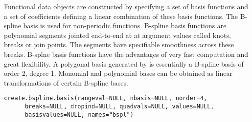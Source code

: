 \documentclass{article}
\begin{document}
\begin{Description}\relax
Functional data objects are constructed by specifying a set of basis
functions and a set of coefficients defining a linear combination of
these basis functions.  The B-spline basis is used for non-periodic
functions.  B-spline basis functions are polynomial segments jointed
end-to-end at at argument values called knots, breaks or join points.
The segments have specifiable smoothness across these breaks.  B-splne
basis functions have the advantages of very fast computation and great
flexibility.  A polygonal basis generated by
 is essentially a B-spline basis of order
2, degree 1.  Monomial and polynomial bases can be obtained as linear
transformations of certain B-spline bases.
\end{Description}
\begin{Usage}
\begin{verbatim}
create.bspline.basis(rangeval=NULL, nbasis=NULL, norder=4,
      breaks=NULL, dropind=NULL, quadvals=NULL, values=NULL,
      basisvalues=NULL, names="bspl")
\end{verbatim}
\end{Usage}
\end{document}
